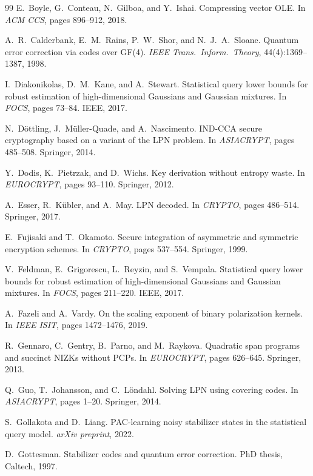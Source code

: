 \documentclass[11pt,a4paper]{article}
\theoremstyle{plain}
\theoremstyle{definition}
\begin{document}
\begin{thebibliography}{99}
E.~Boyle, G.~Conteau, N.~Gilboa, and Y.~Ishai.
Compressing vector OLE.
In \emph{ACM CCS}, pages 896--912, 2018.

A.~R.~Calderbank, E.~M.~Rains, P.~W.~Shor, and N.~J.~A.~Sloane.
Quantum error correction via codes over GF(4).
\emph{IEEE Trans.\ Inform.\ Theory}, 44(4):1369--1387, 1998.

I.~Diakonikolas, D.~M.~Kane, and A.~Stewart.
Statistical query lower bounds for robust estimation of high-dimensional Gaussians and Gaussian mixtures.
In \emph{FOCS}, pages 73--84. IEEE, 2017.

N.~D\"ottling, J.~M\"uller-Quade, and A.~Nascimento.
IND-CCA secure cryptography based on a variant of the LPN problem.
In \emph{ASIACRYPT}, pages 485--508. Springer, 2014.

Y.~Dodis, K.~Pietrzak, and D.~Wichs.
Key derivation without entropy waste.
In \emph{EUROCRYPT}, pages 93--110. Springer, 2012.

A.~Esser, R.~K\"ubler, and A.~May.
LPN decoded.
In \emph{CRYPTO}, pages 486--514. Springer, 2017.

E.~Fujisaki and T.~Okamoto.
Secure integration of asymmetric and symmetric encryption schemes.
In \emph{CRYPTO}, pages 537--554. Springer, 1999.

V.~Feldman, E.~Grigorescu, L.~Reyzin, and S.~Vempala.
Statistical query lower bounds for robust estimation of high-dimensional Gaussians and Gaussian mixtures.
In \emph{FOCS}, pages 211--220. IEEE, 2017.

A.~Fazeli and A.~Vardy.
On the scaling exponent of binary polarization kernels.
In \emph{IEEE ISIT}, pages 1472--1476, 2019.

R.~Gennaro, C.~Gentry, B.~Parno, and M.~Raykova.
Quadratic span programs and succinct NIZKs without PCPs.
In \emph{EUROCRYPT}, pages 626--645. Springer, 2013.

Q.~Guo, T.~Johansson, and C.~L\"ondahl.
Solving LPN using covering codes.
In \emph{ASIACRYPT}, pages 1--20. Springer, 2014.

S.~Gollakota and D.~Liang.
PAC-learning noisy stabilizer states in the statistical query model.
\emph{arXiv preprint}, 2022.

D.~Gottesman.
Stabilizer codes and quantum error correction.
PhD thesis, Caltech, 1997.


\end{thebibliography}
\end{document}
